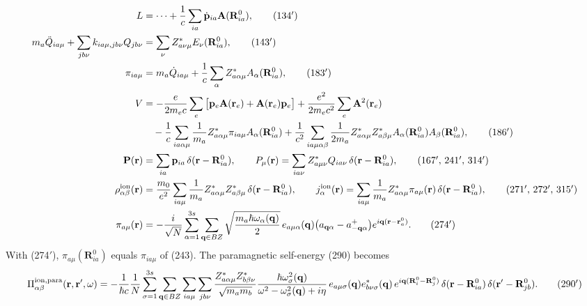 \begin{align}
L&=\dots+\frac1c\sum_{ia}\dot{\mathbf p}_{ia}\mathbf A(\mathbf R^0_{ia}),\tag{134$'$}\\
m_a\ddot Q_{ia\mu}+\sum_{jb\nu}k_{ia\mu,jb\nu}Q_{jb\nu}&=\sum_\nu Z^*_{a\nu\mu}E_\nu(\mathbf R^0_{ia}),\tag{143$'$}\\
\pi_{ia\mu}&=m_a\dot Q_{ia\mu}+\frac1c\sum_\alpha Z^*_{a\alpha\mu}A_\alpha(\mathbf R^0_{ia}),\tag{183$'$}\\
V&=-\frac{e}{2m_ec}\sum_e\big[\mathbf p_e\mathbf A(\mathbf r_e)+\mathbf A(\mathbf r_e)\mathbf p_e\big]+\frac{e^2}{2m_ec^2}\sum_e\mathbf A^2(\mathbf r_e)\notag\\
&\quad-\frac1c\sum_{ia\alpha\mu}\frac{1}{m_a}Z^*_{a\alpha\mu}\pi_{ia\mu}A_\alpha(\mathbf R^0_{ia})+\frac{1}{c^2}\sum_{ia\mu\alpha\beta}\frac{1}{2m_a}Z^*_{a\alpha\mu}Z^*_{a\beta\mu}A_\alpha(\mathbf R^0_{ia})A_\beta(\mathbf R^0_{ia}),\tag{186$'$}\\
\mathbf P(\mathbf r)&=\sum_{ia}\mathbf p_{ia}\,\delta(\mathbf r-\mathbf R^0_{ia}),\qquad
P_\mu(\mathbf r)=\sum_{ia\nu}Z^*_{a\mu\nu}Q_{ia\nu}\,\delta(\mathbf r-\mathbf R^0_{ia}),\tag{167$'$, 241$'$, 314$'$}\\
\rho^{\rm ion}_{\alpha\beta}(\mathbf r)&=\frac{m_0}{e^2}\sum_{ia\mu}\frac{1}{m_a}Z^*_{a\alpha\mu}Z^*_{a\beta\mu}\,\delta(\mathbf r-\mathbf R^0_{ia}),\qquad
j^{\rm ion}_\alpha(\mathbf r)=\sum_{ia\mu}\frac{1}{m_a}Z^*_{a\alpha\mu}\pi_{a\mu}(\mathbf r)\,\delta(\mathbf r-\mathbf R^0_{ia}),\tag{271$'$, 272$'$, 315$'$}\\
\pi_{a\mu}(\mathbf r)&=-\frac{i}{\sqrt N}\sum_{\alpha=1}^{3s}\sum_{\mathbf q\in BZ}\sqrt{\frac{m_a\hbar\omega_\alpha(\mathbf q)}{2}}\,e_{a\mu\alpha}(\mathbf q)\big(a_{\mathbf q\alpha}-a^+_{-\mathbf q\alpha}\big)e^{i\mathbf q(\mathbf r-\mathbf r^0_a)}.\tag{274$'$}
\end{align}
With (274$'$), $\pi_{a\mu}(\mathbf R^0_{ia})$ equals $\pi_{ia\mu}$ of (243). The paramagnetic self-energy (290) becomes
\begin{equation}
\Pi^{\rm ion,para}_{\alpha\beta}(\mathbf r,\mathbf r',\omega)=-\frac{1}{\hbar c}\frac1N\sum_{\sigma=1}^{3s}\sum_{\mathbf q\in BZ}\sum_{ia\mu}\sum_{jb\nu}\frac{Z^*_{a\alpha\mu}Z^*_{b\beta\nu}}{\sqrt{m_am_b}}\frac{\hbar\omega^2_\sigma(\mathbf q)}{\omega^2-\omega^2_\sigma(\mathbf q)+i\eta}\,e_{a\mu\sigma}(\mathbf q)e^*_{b\nu\sigma}(\mathbf q)\,e^{i\mathbf q(\mathbf R^0_i-\mathbf R^0_j)}\,\delta(\mathbf r-\mathbf R^0_{ia})\,\delta(\mathbf r'-\mathbf R^0_{jb}).
\tag{290$'$}
\end{equation}
